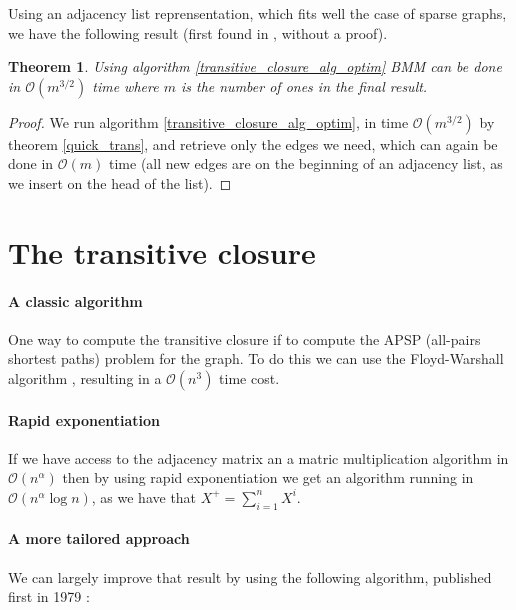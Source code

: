 \documentclass[11pt,a4paper]{article}
\newcommand{\BigO}{\mathcal O}
\newtheorem{Theo}{Theorem}
\theoremstyle{definition}
\begin{document}
Using an adjacency list reprensentation, which fits well
the case of sparse graphs, we have the following result (first found
in \cite{borassi2015into}, without a proof).


\begin{Theo}
\label{fast_product}
  Using algorithm \ref{transitive_closure_alg_optim}
  BMM can be done in
  $\BigO(m^{3/2})$ time where $m$ is the number of ones in the final result.
\end{Theo}



\begin{proof}

  We run algorithm
  \ref{transitive_closure_alg_optim},
  in time $\BigO(m^{3/2})$ by theorem
  \ref{quick_trans}, and retrieve only the edges we need, which can
  again be done in $\BigO(m)$ time (all new edges are on the beginning
  of an adjacency list, as we insert on the head of the list).
\end{proof}


\section{The transitive closure}
\paragraph{A classic algorithm}
One way to compute the transitive closure if to compute 
the APSP (all-pairs shortest 
paths) problem  for the graph. To do this we can use   the 
Floyd-Warshall algorithm \cite{Floyd:1962:A9S:367766.368168},
resulting in a $\BigO(n^3)$ time cost.

\paragraph{Rapid exponentiation}
If we have access to the adjacency matrix an a matric multiplication algorithm
in $\BigO(n^\alpha)$ then by using rapid exponentiation we get an algorithm
running in $\BigO(n^\alpha \log n)$, as we have that 
$X^+=\sum_{i=1}^n X^i$.

\paragraph{A more tailored approach} We can largely improve that 
result by using the following algorithm, published first in 1979
\cite{goralvcikova1979reduct}:
\end{document}
